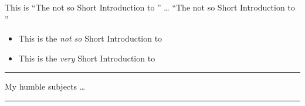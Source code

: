 \documentclass{article}
\begin{document}
\newcommand{\tnss}{The not
so Short Introduction to
\LaTeXe}
This is ``\tnss'' \ldots{}
``\tnss''

\newcommand{\txsit}[1]
{This is the \emph{#1} Short
Introduction to \LaTeXe}
\begin{itemize}
\item \txsit{not so}
\item \txsit{very}
\end{itemize}

\newenvironment{king}
{\rule{1ex}{1ex}%
\hspace{\stretch{1}}}
{%
\rule{1ex}{1ex}}
\begin{king}
My humble subjects \ldots
\end{king}
\end{document}
